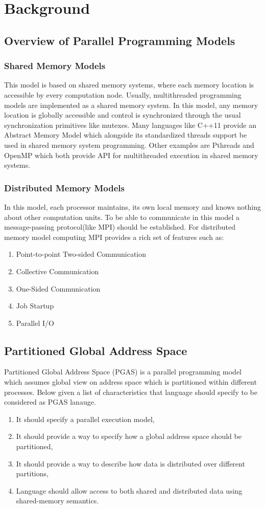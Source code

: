 \documentclass[14pt]{extreport}
\newcommand\blankpage{
    \null
    \thispagestyle{empty}
    \newpage
    }
\begin{document}
\blankpage
\section{Background}
\subsection{Overview of Parallel Programming Models}
\subsubsection{Shared Memory Models}
This model is based on shared memory systems, where each memory location is accessible by every computation node. Usually, multithreaded programming models are implemented as a shared memory system. In this model, any memory location is globally accessible and control is synchronized through the usual synchronization primitives like mutexes. Many languages like C++11 provide an Abstract Memory Model which alongside its standardized threads support be used in shared memory system programming. Other examples are Pthreads and OpenMP which both provide API for multithreaded execution in shared memory systems.
\subsubsection{Distributed Memory Models}
In this model, each processor maintains, its own local memory and knows nothing about other computation units.
To be able to communicate in this model a message-passing protocol(like MPI) should be established. For distributed memory model computing MPI provides a rich set of features such as:
\begin{enumerate}
\item Point-to-point Two-sided Communication
\item Collective Communication 
\item One-Sided Communication
\item Job Startup
\item Parallel I/O
\end{enumerate}

\subsection{Partitioned Global Address Space}
Partitioned Global Address Space (PGAS) is a parallel programming model which assumes global view on address space which is partitioned within different processes. Below given a list of characteristics that language should specify to be considered as PGAS lanauge\cite{pgaslangs}.
\begin{enumerate}
	\item It should specify a parallel execution model,
	\item It should provide a way to specify how a global address space should be partitioned,
	\item It should provide a way to describe how data is distributed over different partitions,
	\item Language should allow access to both shared and distributed data using shared-memory semantics.
\end{enumerate}
\end{document}
